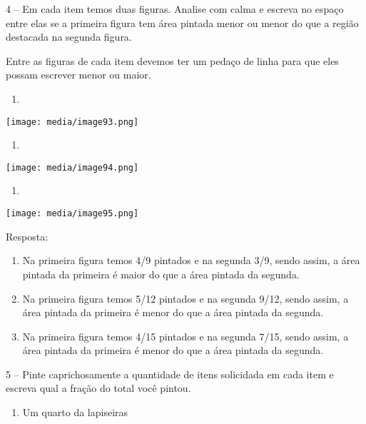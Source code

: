 4 -- Em cada item temos duas figuras. Analise com calma e escreva no
espaço entre elas se a primeira figura tem área pintada menor ou menor
do que a região destacada na segunda figura.

Entre as figuras de cada item devemos ter um pedaço de linha para que
eles possam escrever menor ou maior.

\begin{enumerate}
\def\labelenumi{\alph{enumi})}
\item
\end{enumerate}

\texttt{[image: media/image93.png]}

\begin{enumerate}
\def\labelenumi{\alph{enumi})}
\item
\end{enumerate}

\texttt{[image: media/image94.png]}

\begin{enumerate}
\def\labelenumi{\alph{enumi})}
\item
\end{enumerate}

\texttt{[image: media/image95.png]}

Resposta:

\begin{enumerate}
\def\labelenumi{\alph{enumi})}
\item
  Na primeira figura temos 4/9 pintados e na segunda 3/9, sendo assim, a
  área pintada da primeira é maior do que a área pintada da segunda.
\item
  Na primeira figura temos 5/12 pintados e na segunda 9/12, sendo assim,
  a área pintada da primeira é menor do que a área pintada da segunda.
\item
  Na primeira figura temos 4/15 pintados e na segunda 7/15, sendo assim,
  a área pintada da primeira é menor do que a área pintada da segunda.
\end{enumerate}

5 -- Pinte caprichosamente a quantidade de itens solicidada em cada item
e escreva qual a fração do total você pintou.

\begin{enumerate}
\def\labelenumi{\alph{enumi})}
\item
  Um quarto da lapiseiras
\end{enumerate}

